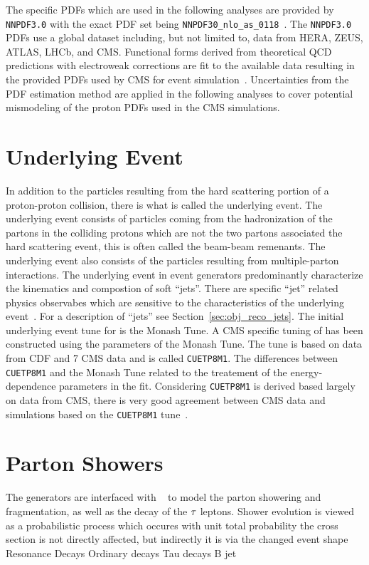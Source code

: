 The specific PDFs which are used in the
following analyses are provided by \texttt{NNPDF3.0} with the exact PDF set being 
\texttt{NNPDF30\_nlo\_as\_0118}~\cite{Ball:2014uwa, Ball:2011uy}. The \texttt{NNPDF3.0} PDFs
use a global dataset including, but not limited to, data from HERA, ZEUS, ATLAS, LHCb, and CMS.
Functional forms derived from theoretical QCD predictions with electroweak corrections are fit
to the available data resulting in the provided PDFs used by CMS for event simulation~\cite{Ball:2014uwa}.
Uncertainties from the PDF estimation method are applied in the following analyses to cover
potential mismodeling of the proton PDFs used in the CMS simulations.



\section{Underlying Event}
In addition to the particles resulting from the hard scattering portion of a proton-proton collision,
there is what is called the underlying event. The underlying event consists of particles coming from
the hadronization of the partons in the colliding protons which are not the two partons associated the
hard scattering event, this is often called the beam-beam remenants. The underlying event also
consists of the particles resulting from multiple-parton interactions. The underlying event in 
event generators predominantly characterize the kinematics and compostion of soft ``jets''.
There are specific ``jet'' related physics observabes which are sensitive to the characteristics of the underlying
event~\cite{Khachatryan:2015pea, Field:cdf2008}. For a description of ``jets'' see Section~\ref{sec:obj_reco_jets}.
The initial underlying event tune for  is the Monash Tune. A CMS specific tuning of 
 has been constructed using the parameters of the Monash Tune. The tune is based
on data from CDF and 7 \TeV CMS data and is called \texttt{CUETP8M1}. The differences between
\texttt{CUETP8M1} and the Monash Tune related to the treatement of the energy-dependence 
parameters in the fit. Considering \texttt{CUETP8M1} is derived based largely on data from
CMS, there is very good agreement between CMS data and simulations based on the
\texttt{CUETP8M1} tune~\cite{Khachatryan:2015pea}. 



\section{Parton Showers}
The generators are interfaced with  ~\cite{Sjostrand:2014zea} to model the parton showering and fragmentation, as well as the decay of the $\tau$ leptons.
    Shower evolution is viewed as a probabilistic process which occures with unit total probability
    the cross section is not directly affected, but indirectly it is via the changed event shape
    Resonance Decays
Ordinary decays
    Tau decays
    B jet




